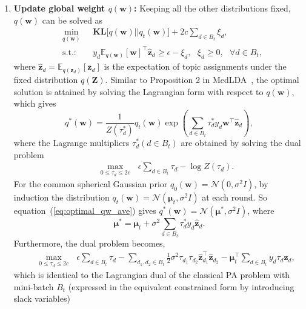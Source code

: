 \documentclass[twoside,11pt]{article}
\newcommand{\zv}{\bm{z}}
\newcommand{\Zv}{\bm{Z}}
\newcommand{\wv}{\bm{w}}
\newcommand{\muv}{\bm \mu}
\newcommand{\ep}{\mathbb{E}}
\newcommand{\KL}{\textbf{KL}}
\newcommand{\barzv}{\bm{\bar{z}}}
\newcommand{\subto}{\text{s.t.:}}
\newcommand{\normal}{\mathcal{N}}
\newcommand\refeq[1]{(\ref{#1})}
\begin{document}
\begin{enumerate}
\item \textbf{Update global weight $q(\wv)$:} Keeping all the other distributions fixed, $q(\wv)$ can be solved as
\setlength\arraycolsep{0 pt}\begin{eqnarray*}
& \underset{q(\wv)}{\operatorname{min}}~~~ & \KL\Big[q(\wv) || q_t(\wv)\Big] + 2c \sum\limits_{d \in B_t}{\xi_d}, \\
& \subto & y_d \ep_{q(\wv)}[\wv]^\top \widehat{\zv}_d \geq \epsilon-\xi_d, ~~~\xi_d \geq 0, ~~~ \forall d \in B_t,
\end{eqnarray*}
where $\widehat{\zv}_d = \ep_{q(\zv_d)}[\barzv_d]$ is the expectation of topic assignments under the fixed  distribution $q(\Zv)$. Similar to Proposition 2 in MedLDA~\citep{zhu2012medlda}, the optimal solution is attained by solving the Lagrangian form with respect to $q(\wv)$, which gives
\begin{equation} \label{eq:optimal_qw_ave}
q^*(\wv) = \frac{1}{Z(\tau_d^*)}q_t(\wv) \exp\left( \sum\limits_{d \in B_t}{\tau_d^* y_d \wv^\top \widehat{\zv}_d} \right) ,
\end{equation}
where the Lagrange multipliers $\tau_d^* (d \in B_t)$  are obtained by solving the dual problem
\setlength\arraycolsep{0 pt}\begin{eqnarray*}
&& \underset{0 \leq \tau_d \leq 2c}{\operatorname{max}}{~~~\epsilon \sum\limits_{d \in B_t}{\tau_d}-\log Z(\tau_d)}.
\end{eqnarray*}
For the common spherical Gaussian prior $q_0(\wv) = \normal(0, \sigma^2 I)$, by induction the distribution $q_t(\wv) = \normal(\muv_t, \sigma^2I)$ at each round.  So equation~\refeq{eq:optimal_qw_ave} gives $q^*(\wv) = \normal(\muv^*, \sigma^2 I)$, where
\begin{equation} \label{eq:pa_avgupdate_w}
\muv^* = \muv_t+\sigma^2 \sum\limits_{d \in B_t} \tau_d^* y_d \widehat{\zv}_d.
\end{equation}
Furthermore, the dual problem becomes,
\setlength\arraycolsep{0 pt}\begin{eqnarray} \label{eq:pamedlda_dual}
&& \underset{0 \leq \tau_d \leq 2c}{\operatorname{max}}{~~~\epsilon \sum\limits_{d \in B_t}{\tau_d}-\sum_{d_1, d_2 \in B_t}{\frac{1}{2} \sigma^2 \tau_{d_1} \tau_{d_2} \widehat{\zv}_{d_1}^\top \widehat{\zv}_{d_2}} - \muv_t^\top \sum_{d \in B_t}{y_d \tau_d \widehat{\zv}_d}},
\end{eqnarray}
which is identical to the Lagrangian dual of the classical PA problem with mini-batch $B_t$ (expressed in the equivalent constrained form by introducing slack variables)
\begin{equation} \label{eq:pamedlda_primal}

\end{equation}
\end{enumerate}
\end{document}

